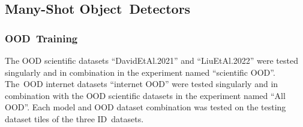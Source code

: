 \documentclass[12pt,a4paper,oneside]{report}
\begin{document}
\subsection{Many-Shot Object~Detectors}

\subsubsection{OOD~Training}

The OOD scientific datasets ``DavidEtAl.2021'' and ``LiuEtAl.2022'' were tested singularly 
and in combination in the experiment named ``scientific OOD''. The~OOD internet datasets ``internet OOD''
were tested singularly and in combination with the OOD scientific datasets in the experiment named ``All OOD''.
Each model and OOD dataset combination was tested on the testing dataset tiles of the three ID~datasets.
\end{document}
